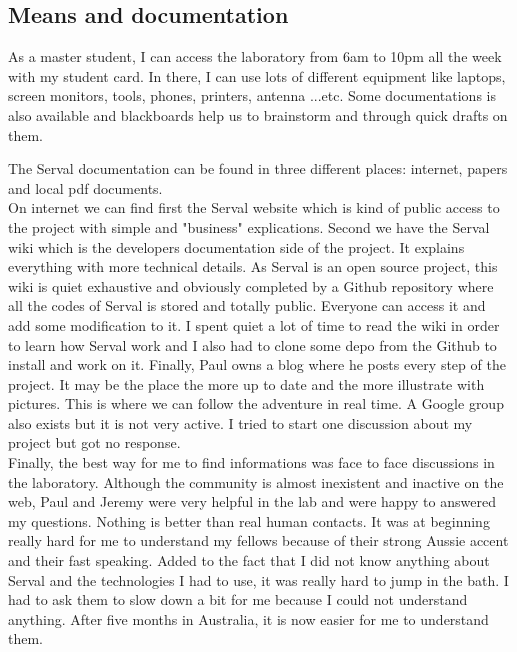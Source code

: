 \subsection{Means and documentation}
As a master student, I can access the laboratory from 6am to 10pm all the week with my student card. In there, I can use lots of different equipment like laptops, screen monitors, tools, phones, printers, antenna ...etc. Some documentations is also available and blackboards help us to brainstorm and through quick drafts on them.
\par
The Serval documentation can be found in three different places: internet, papers and local pdf documents. 
\\
On internet we can find first the Serval website which is kind of public access to the project with simple and "business" explications. Second we have the Serval wiki which is the developers documentation side of the project. It explains everything with more technical details. As Serval is an open source project, this wiki is quiet exhaustive and obviously completed by a Github repository where all the codes of Serval is stored and totally public. Everyone can access it and add some modification to it. I spent quiet a lot of time to read the wiki in order to learn how Serval work and I also had to clone some depo from the Github to install and work on it. Finally, Paul owns a blog where he posts every step of the project. It may be the place the more up to date and the more illustrate with pictures. This is where we can follow the adventure in real time. A Google group also exists but it is not very active. I tried to start one discussion about my project but got no response.
\\
Finally, the best way for me to find informations was face to face discussions in the laboratory. Although the community is almost inexistent and inactive on the web, Paul and Jeremy were very helpful in the lab and were happy to answered my questions. Nothing is better than real human contacts. It was at beginning really hard for me to understand my fellows because of their strong Aussie accent and their fast speaking. Added to the fact that I did not know anything about Serval and the technologies I had to use, it was really hard to jump in the bath. I had to ask them to slow down a bit for me because I could not understand anything. After five months in Australia, it is now easier for me to understand them.  


